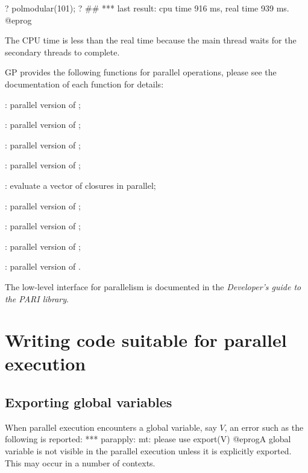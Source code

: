 \bprog
? polmodular(101);
? ##
  ***   last result: cpu time 916 ms, real time 939 ms.
@eprog

The CPU time is less than the real time because the main thread waits for
the secondary threads to complete.


GP provides the following functions for parallel operations, please
see the documentation of each function for details:

\item {}: parallel version of ;

\item {}:  parallel version of ;

\item {}:    parallel version of ;

\item {}:    parallel version of ;

\item {}:   evaluate a vector of closures in parallel;

\item {}:    parallel version of ;

\item {}:   parallel version of ;

\item {}: parallel version of ;

\item {}: parallel version of .

The low-level  interface for parallelism is documented
in the \emph{Developer's guide to the PARI library}.
\newpage

\chapter{Writing code suitable for parallel execution}

\section{Exporting global variables}

When parallel execution encounters a global variable, say $V$,
an error such as the following is reported:
\bprog
  *** parapply: mt: please use export(V)
@eprog\noindent A global variable is not visible in the parallel execution
unless it is explicitly exported. This may occur in a number of contexts.


